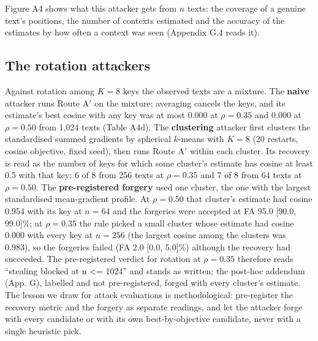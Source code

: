 \documentclass[11pt,letterpaper]{article}
\begin{document}
Figure A4 shows what this attacker gets from \(n\) texts: the coverage of a genuine text's positions, the number of contexts estimated and the accuracy of the estimates by how often a context was seen (Appendix G.4 reads it).

\hypertarget{the-rotation-attackers}{%
\subsection{The rotation attackers}\label{the-rotation-attackers}}

Against rotation among \(K = 8\) keys the observed texts are a mixture. The \textbf{naive} attacker runs Route A\ensuremath{'} on the mixture; averaging cancels the keys, and its estimate's best cosine with any key was at most 0.000 at \(\rho = 0.35\) and 0.000 at \(\rho = 0.50\) from 1,024 texts (Table A4d). The \textbf{clustering} attacker first clusters the standardised summed gradients by spherical \(k\)-means \citep{dhillon2001spherical} with \(K = 8\) (20 restarts, cosine objective, fixed seed), then runs Route A\ensuremath{'} within each cluster. Its recovery is read as the number of keys for which some cluster's estimate has cosine at least 0.5 with that key: 6 of 8 from 256 texts at \(\rho = 0.35\) and 7 of 8 from 64 texts at \(\rho = 0.50\). The \textbf{pre-registered forgery} used one cluster, the one with the largest standardised mean-gradient profile. At \(\rho = 0.50\) that cluster's estimate had cosine 0.954 with its key at \(n = 64\) and the forgeries were accepted at FA 95.0 {[}90.0, 99.0{]}\%; at \(\rho = 0.35\) the rule picked a small cluster whose estimate had cosine 0.000 with every key at \(n = 256\) (the largest cosine among the clusters was 0.983), so the forgeries failed (FA 2.0 {[}0.0, 5.0{]}\%) although the recovery had succeeded. The pre-registered verdict for rotation at \(\rho = 0.35\) therefore reads ``stealing blocked at n \textless= 1024'' and stands as written; the post-hoc addendum (App. G), labelled and not pre-registered, forged with every cluster's estimate. The lesson we draw for attack evaluations is methodological: pre-register the recovery metric and the forgery as separate readings, and let the attacker forge with every candidate or with its own best-by-objective candidate, never with a single heuristic pick.
\end{document}
